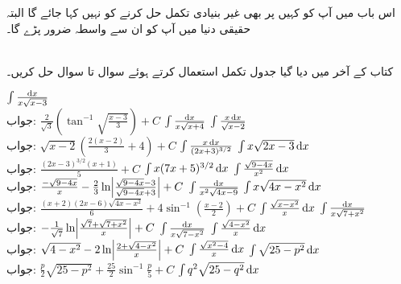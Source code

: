 اس باب میں آپ کو کہیں پر بھی غیر بنیادی تکمل حل کرنے کو نہیں کہا جائے گا البتہ حقیقی دنیا میں آپ کو ان سے واسطہ ضرور پڑے گا۔

\\
کتاب کے آخر میں دیا گیا جدول تکمل استعمال کرتے ہوئے سوال  تا سوال  حل کریں۔

$\int\frac{\dif x}{x\sqrt{x-3}}$\\
جواب:\quad
$\tfrac{2}{\sqrt{3}}(\tan^{-1}\sqrt{\tfrac{x-3}{3}})+C$
$\int\frac{\dif x}{x\sqrt{x+4}}$
$\int\frac{x\dif x}{\sqrt{x-2}}$\\
جواب:\quad
$\sqrt{x-2}(\tfrac{2(x-2)}{3}+4)+C$
$\int\frac{x\dif x}{(2x+3)^{3/2}}$
$\int x\sqrt{2x-3}\dif x$\\
جواب:\quad
$\tfrac{(2x-3)^{3/2}(x+1)}{5}+C$
$\int x(7x+5)^{3/2}\dif x$
$\int \frac{\sqrt{9-4x}}{x^2}\dif x$\\
جواب:\quad
$\tfrac{-\sqrt{9-4x}}{x}-\tfrac{2}{3}\ln\abs{\tfrac{\sqrt{9-4x}-3}{\sqrt{9-4x}+3}}+C$
$\int\frac{\dif x}{x^2\sqrt{4x-9}}$
$\int x\sqrt{4x-x^2}\dif x$\\
جواب:\quad
$\tfrac{(x+2)(2x-6)\sqrt{4x-x^2}}{6}+4\sin^{-1}(\tfrac{x-2}{2})+C$
$\int\frac{\sqrt{x-x^2}}{x}\dif x$
$\int\frac{\dif x}{x\sqrt{7+x^2}}$\\
جواب:\quad
$-\tfrac{1}{\sqrt{7}}\ln\abs{\tfrac{\sqrt{7}+\sqrt{7+x^2}}{x}}+C$
$\int\frac{\dif x}{x\sqrt{7-x^2}}$
$\int\frac{\sqrt{4-x^2}}{x}\dif x$\\
جواب:\quad
$\sqrt{4-x^2}-2\ln\abs{\tfrac{2+\sqrt{4-x^2}}{x}}+C$
$\int\frac{\sqrt{x^2-4}}{x}\dif x$
$\int\sqrt{25-p^2}\dif x$\\
جواب:\quad
$\tfrac{p}{2}\sqrt{25-p^2}+\tfrac{25}{2}\sin^{-1}\tfrac{p}{5}+C$
$\int q^2\sqrt{25-q^2}\dif x$
